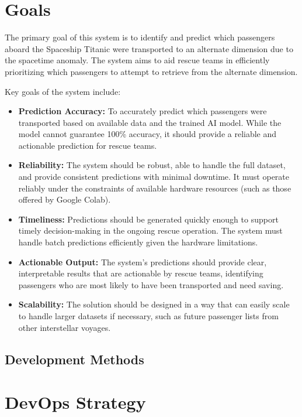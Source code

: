 \documentclass[15pt]{article}
\begin{document}
\section{Goals}

The primary goal of this system is to identify and predict which passengers aboard the Spaceship Titanic were transported to an alternate dimension due to the spacetime anomaly. The system aims to aid rescue teams in efficiently prioritizing which passengers to attempt to retrieve from the alternate dimension.

Key goals of the system include:

\begin{itemize}
    \item \textbf{Prediction Accuracy:} To accurately predict which passengers were transported based on available data and the trained AI model. While the model cannot guarantee 100\% accuracy, it should provide a reliable and actionable prediction for rescue teams.
    
    \item \textbf{Reliability:} The system should be robust, able to handle the full dataset, and provide consistent predictions with minimal downtime. It must operate reliably under the constraints of available hardware resources (such as those offered by Google Colab).
    
    \item \textbf{Timeliness:} Predictions should be generated quickly enough to support timely decision-making in the ongoing rescue operation. The system must handle batch predictions efficiently given the hardware limitations.
    
    \item \textbf{Actionable Output:} The system’s predictions should provide clear, interpretable results that are actionable by rescue teams, identifying passengers who are most likely to have been transported and need saving.
    
    \item \textbf{Scalability:} The solution should be designed in a way that can easily scale to handle larger datasets if necessary, such as future passenger lists from other interstellar voyages.
\end{itemize}
\subsection{Development Methods}
\section{DevOps Strategy}
\end{document}
